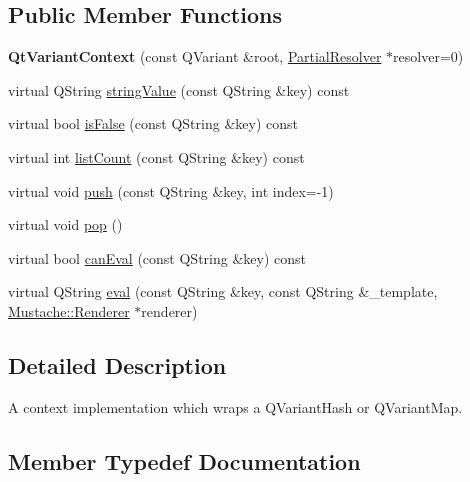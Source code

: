 \subsection*{Public Member Functions}
\begin{DoxyCompactItemize}
\item 
\hypertarget{classMustache_1_1QtVariantContext_ac9eff9d97c00dbcad6b38670327050ee}{}{\bfseries Qt\+Variant\+Context} (const Q\+Variant \&root, \hyperlink{classMustache_1_1PartialResolver}{Partial\+Resolver} $\ast$resolver=0)\label{classMustache_1_1QtVariantContext_ac9eff9d97c00dbcad6b38670327050ee}

\item 
virtual Q\+String \hyperlink{classMustache_1_1QtVariantContext_a55b19269efa6924edf21118ab0b49e08}{string\+Value} (const Q\+String \&key) const 
\item 
virtual bool \hyperlink{classMustache_1_1QtVariantContext_af5f93b6ff7ac3c24928757a2af1b8820}{is\+False} (const Q\+String \&key) const 
\item 
virtual int \hyperlink{classMustache_1_1QtVariantContext_aa055fefa606e0958549cb4671e628e9c}{list\+Count} (const Q\+String \&key) const 
\item 
virtual void \hyperlink{classMustache_1_1QtVariantContext_aa5164d437812877c96faa833d8ce5eac}{push} (const Q\+String \&key, int index=-\/1)
\item 
virtual void \hyperlink{classMustache_1_1QtVariantContext_adfb3067d5cf209e4203a0b1754008efc}{pop} ()
\item 
virtual bool \hyperlink{classMustache_1_1QtVariantContext_a2671990a3c9d8d4d7b626fa85b841ab2}{can\+Eval} (const Q\+String \&key) const 
\item 
virtual Q\+String \hyperlink{classMustache_1_1QtVariantContext_a0602be333afa1d4fa89c2c5820311bf1}{eval} (const Q\+String \&key, const Q\+String \&\+\_\+template, \hyperlink{classMustache_1_1Renderer}{Mustache\+::\+Renderer} $\ast$renderer)
\end{DoxyCompactItemize}


\subsection{Detailed Description}
A context implementation which wraps a Q\+Variant\+Hash or Q\+Variant\+Map. 

\subsection{Member Typedef Documentation}
\hypertarget{classMustache_1_1QtVariantContext_a7cbe08798c8b9516223c380087f82e7b}{}

